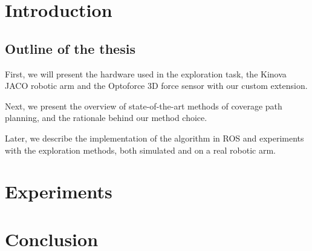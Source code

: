 \documentclass[twoside,oneside]{ctuthesis}
\theoremstyle{plain}
\theoremstyle{definition}
\theoremstyle{note}
\begin{document}
\maketitle

\chapter{Introduction}
\label{chap:intro}

\section{Outline of the thesis}
\label{sec:outline}

First, we will present the hardware used in the exploration task, the Kinova JACO robotic arm and the Optoforce 3D force sensor with our custom extension.

Next, we present the overview of state-of-the-art methods of coverage path planning, and the rationale behind our method choice.

Later, we describe the implementation of the algorithm in ROS and experiments with the exploration methods, both simulated and on a real robotic arm.















\chapter{Experiments}



\chapter{Conclusion}


\appendix




\end{document}
